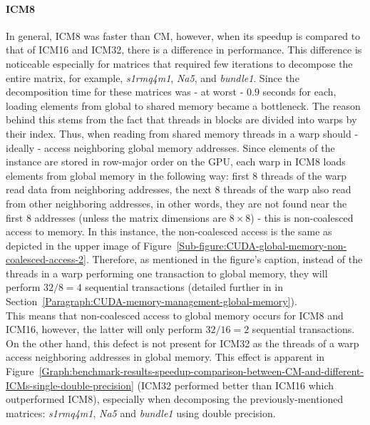 \paragraph{ICM8} In general, ICM8 was faster than CM, however, when its speedup is compared to that of ICM16 and ICM32, there is a difference in performance. This difference is noticeable especially for matrices that required few iterations to decompose the entire matrix, for example, \textit{s1rmq4m1}, \textit{Na5}, and \textit{bundle1}. Since the decomposition time for these matrices was - at worst - $ 0.9 $ seconds for each, loading elements from global to shared memory became a bottleneck. The reason behind this stems from the fact that threads in blocks are divided into warps by their  index. Thus, when reading from shared memory threads in a warp should - ideally - access neighboring global memory addresses. Since elements of the  instance are stored in row-major order on the GPU, each warp in ICM8 loads elements from global memory in the following way: first 8 threads of the warp read data from neighboring addresses, the next 8 threads of the warp also read from other neighboring addresses, in other words, they are not found near the first 8 addresses (unless the matrix dimensions are $ 8\times 8 $) - this is non-coalesced access to memory. In this instance, the non-coalesced access is the same as depicted in the upper image of Figure~\ref{Sub-figure:CUDA-global-memory-non-coalesced-access-2}. Therefore, as mentioned in the figure's caption, instead of the threads in a warp performing one transaction to global memory, they will perform $ 32/8 = 4 $ sequential transactions (detailed further in \textit{} in Section~\ref{Paragraph:CUDA-memory-management-global-memory}). \\
This means that non-coalesced access to global memory occurs for ICM8 and ICM16, however, the latter will only perform $ 32/16 = 2 $ sequential transactions. On the other hand, this defect is not present for ICM32 as the threads of a warp access  neighboring addresses in global memory. This effect is apparent in Figure~\ref{Graph:benchmark-results-speedup-comparison-between-CM-and-different-ICMs-single-double-precision} (ICM32 performed better than ICM16 which outperformed ICM8), especially when decomposing the previously-mentioned matrices: \textit{s1rmq4m1}, \textit{Na5} and \textit{bundle1} using double precision.
